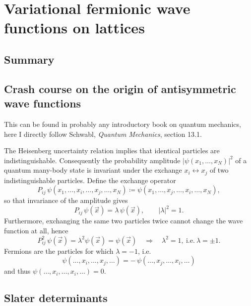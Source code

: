 \documentclass[../../main.tex]{subfiles}
\begin{document}
\section{Variational fermionic wave functions on lattices}
\label{sec:variational-fermionic-wave-functions}

\subsection{Summary}

\subsection{Crash course on the origin of antisymmetric wave functions}

This can be found in probably any introductory book on quantum mechanics, here I directly follow Schwabl, \emph{Quantum Mechanics}, section 13.1.

The Heisenberg uncertainty relation implies that identical particles are
indistinguishable. Consequently the probability amplitude
$|\psi(x_1,\dots,x_N)|^2$ of a quantum many-body state is invariant under the
exchange $x_i\leftrightarrow x_j$ of two indistinguishable particles. Define the
exchange operator
\begin{equation}
P_{ij}\,\psi(x_1,\dots,x_i,\dots,x_j,\dots,x_N)
\coloneqq \psi(x_1,\dots,x_j,\dots,x_i,\dots,x_N),
\end{equation}
so that invariance of the amplitude gives
\begin{equation}
P_{ij}\,\psi(\vec x)=\lambda\,\psi(\vec x),\qquad |\lambda|^2=1 .
\end{equation}
Furthermore, exchanging the same two particles twice cannot change the wave
function at all, hence
\begin{equation}
P_{ij}^2\,\psi(\vec x)=\lambda^2\psi(\vec x)=\psi(\vec x)
\quad\Longrightarrow\quad \lambda^2=1,\ \text{i.e.}\ \lambda=\pm1 .
\end{equation}
Fermions are the particles for which $\lambda=-1$, i.e.
\begin{equation}
\boxed{\;\psi(\dots,x_i,\dots,x_j,\dots)=-\,\psi(\dots,x_j,\dots,x_i,\dots)\;}
\end{equation}
and thus $\psi(\dots,x_i,\dots,x_i,\dots)=0$.

\subsection{Slater determinants}
\end{document}
